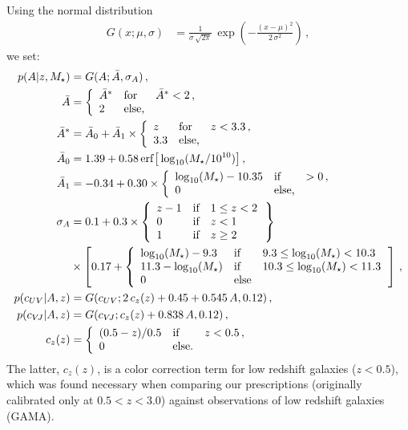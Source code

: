 \documentclass[11pt,a4paper]{article}
\newcommand{\mstar}{M_\star}
\numberwithin{equation}{section}
\begin{document}
Using the normal distribution
\begin{align}
G(x; \mu, \sigma) &= \frac{1}{\sigma\,\sqrt{2\pi}}\,\exp\left(-\frac{(x-\mu)^2}{2\,\sigma^2}\right)\,,
\end{align}
we set:
\begin{align}
p(A | z, \mstar) &= G(A; \bar{A}, \sigma_A)\,, \\
\bar{A} &= \left\{\begin{array}{lll}
\bar{A}^* & \text{for} & \bar{A}^* < 2\,, \\
2 & \text{else,}
\end{array}\right.\\
\bar{A}^* &= \bar{A}_0 + \bar{A}_1\times\left\{\begin{array}{lll}
z & \text{for} & z < 3.3\,, \\
3.3 & \text{else,} \\
\end{array}\right.\\
\bar{A}_0 &= 1.39 + 0.58\,{\rm erf}\big[\log_{10}(\mstar/10^{10})\big]\,, \\
\bar{A}_1 &= -0.34 + 0.30\times\left\{\begin{array}{lll}
\log_{10}(\mstar) - 10.35 & \text{if} & > 0\,, \\
0 & \text{else,} \\
\end{array}\right. \\
\sigma_A &= 0.1 + 0.3\times\left\{\begin{array}{lll}
z-1 & \text{if} & 1 \le z < 2\, \\
0 & \text{if} & z < 1\, \\
1 & \text{if} & z \ge 2\, \\
\end{array}\right\}\\
&\times\left[0.17 + \left\{\begin{array}{lll}
\log_{10}(\mstar) - 9.3 & \text{if} & 9.3 \le \log_{10}(\mstar) < 10.3 \\
11.3 - \log_{10}(\mstar) & \text{if} & 10.3 \le \log_{10}(\mstar) < 11.3 \\
0 & \text{else}
\end{array}\right.\right]\,, \\
p(c_{UV} | A, z) &= G(c_{UV}; 2\,c_z(z)+0.45+0.545\,A, 0.12)\,, \\
p(c_{V\!J} | A, z) &= G(c_{V\!J}; c_z(z)+0.838\,A, 0.12)\,, \\
c_z(z) &= \left\{\begin{array}{lll}
(0.5 - z)/0.5 & \text{if} & z < 0.5\,, \\
0 & \text{else.} \\
\end{array}\right.
\end{align}
The latter, $c_z(z)$, is a color correction term for low redshift galaxies ($z<0.5$), which was found necessary when comparing our prescriptions (originally calibrated only at $0.5<z<3.0$) against observations of low redshift galaxies (GAMA).
\end{document}
